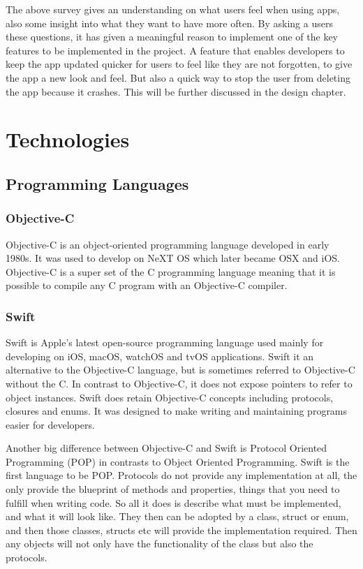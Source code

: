The above survey gives an understanding on what users feel when using apps, also some insight into what they want to have more often. By asking a users these questions, it has given a meaningful reason to implement one of the key features to be implemented in the project. A feature that enables developers to keep the app updated quicker for users to feel like they are not forgotten, to give the app a new look and feel. But also a quick way to stop the user from deleting the app because it crashes. This will be further discussed in the design chapter.



\section{Technologies}

\subsection{Programming Languages}

\subsubsection{Objective-C}
Objective-C \cite{objectiveC} is an object-oriented programming language developed in early 1980s.  It was used to develop on NeXT OS which later became OSX and iOS.  Objective-C is a super set of the  C programming language meaning that it is possible to compile any C program with an Objective-C compiler. 

\subsubsection{Swift}
Swift \cite{swift} is Apple’s latest open-source programming language used mainly for developing on iOS, macOS, watchOS and tvOS applications.  Swift it an alternative to the Objective-C language, but is sometimes referred to Objective-C without the C. In contrast to Objective-C, it does not expose pointers to refer to object instances. Swift does retain Objective-C concepts including protocols, closures and enums. It was designed to make writing and maintaining programs easier for developers.

Another big difference between Objective-C and Swift is Protocol Oriented Programming (POP) in contrasts to Object Oriented Programming. Swift is the first language to be POP. Protocols do not provide any implementation at all, the only provide the blueprint of methods and properties, things that you need to fulfill when writing code. So all it does is describe what must be implemented, and what it will look like. They then can be adopted by a class, struct or enum, and then those classes, structs etc will provide the implementation required. Then any objects will not only have the functionality of the class but also the protocols.

